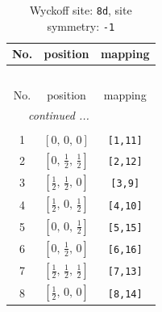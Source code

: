 \documentclass[fleqn,8pt]{jsarticle}
\begin{document}
\begin{longtable}{ccc}
\caption{Wyckoff site: {\tt 8d}, site symmetry: {\tt -1}}
 \\
 \hline \hline
No. & position & mapping \\ \hline \endfirsthead

\multicolumn{2}{l}{\tablename\ \thetable{}} \\
 \hline \hline
No. & position & mapping \\ \hline \endhead

 \hline \hline
\multicolumn{2}{r}{\footnotesize\it continued ...} \\ \endfoot

 \hline \hline
\multicolumn{2}{r}{} \\ \endlastfoot

1 & $\left[ 0,\, 0,\, 0 \right]$ & {\tt [1,11]} \\ \hline
2 & $\left[ 0,\, \frac{1}{2},\, \frac{1}{2} \right]$ & {\tt [2,12]} \\ \hline
3 & $\left[ \frac{1}{2},\, \frac{1}{2},\, 0 \right]$ & {\tt [3,9]} \\ \hline
4 & $\left[ \frac{1}{2},\, 0,\, \frac{1}{2} \right]$ & {\tt [4,10]} \\ \hline
5 & $\left[ 0,\, 0,\, \frac{1}{2} \right]$ & {\tt [5,15]} \\ \hline
6 & $\left[ 0,\, \frac{1}{2},\, 0 \right]$ & {\tt [6,16]} \\ \hline
7 & $\left[ \frac{1}{2},\, \frac{1}{2},\, \frac{1}{2} \right]$ & {\tt [7,13]} \\ \hline
8 & $\left[ \frac{1}{2},\, 0,\, 0 \right]$ & {\tt [8,14]} \\
\end{longtable}
\renewcommand{\arraystretch}{1.2}
\end{document}
